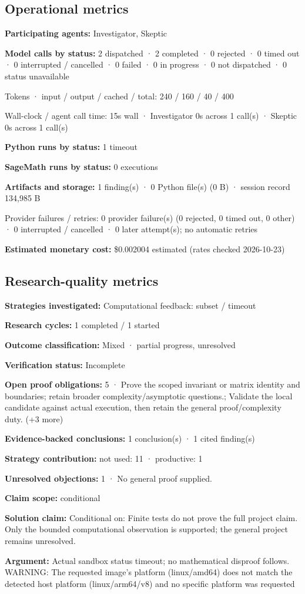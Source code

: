 \documentclass[11pt]{article}
\begin{document}
\subsection{Operational metrics}
\textbf{Participating agents:} Investigator, Skeptic\par
\textbf{Model calls by status:} 2 dispatched · 2 completed · 0 rejected · 0 timed out · 0 interrupted / cancelled · 0 failed · 0 in progress · 0 not dispatched · 0 status unavailable\par
Tokens · input / output / cached / total: 240 / 160 / 40 / 400\par
Wall-clock / agent call time: 15s wall · Investigator 0s across 1 call(s) · Skeptic 0s across 1 call(s)\par
\textbf{Python runs by status:} 1 timeout\par
\textbf{SageMath runs by status:} 0 executions\par
\textbf{Artifacts and storage:} 1 finding(s) · 0 Python file(s) (0 B) · session record 134,985 B\par
Provider failures / retries: 0 provider failure(s) (0 rejected, 0 timed out, 0 other) · 0 interrupted / cancelled · 0 later attempt(s); no automatic retries\par
\textbf{Estimated monetary cost:} \$0.002004 estimated (rates checked 2026-10-23)\par
\subsection{Research-quality metrics}
\textbf{Strategies investigated:} Computational feedback: subset / timeout\par
\textbf{Research cycles:} 1 completed / 1 started\par
\textbf{Outcome classification:} Mixed · partial progress, unresolved\par
\textbf{Verification status:} Incomplete\par
\textbf{Open proof obligations:} 5 · Prove the scoped invariant or matrix identity and boundaries; retain broader complexity/asymptotic questions.; Validate the local candidate against actual execution, then retain the general proof/complexity duty. (+3 more)\par
\textbf{Evidence-backed conclusions:} 1 conclusion(s) · 1 cited finding(s)\par
\textbf{Strategy contribution:} not used: 11 · productive: 1\par
\textbf{Unresolved objections:} 1 · No general proof supplied.\par
\textbf{Claim scope:} conditional\par
\textbf{Solution claim:} Conditional on: Finite tests do not prove the full project claim. Only the bounded computational observation is supported; the general project remains unresolved.\par
\textbf{Argument:} Actual sandbox status timeout; no mathematical disproof follows. WARNING: The requested image's platform (linux/amd64) does not match the detected host platform (linux/arm64/v8) and no specific platform was requested
\end{document}
